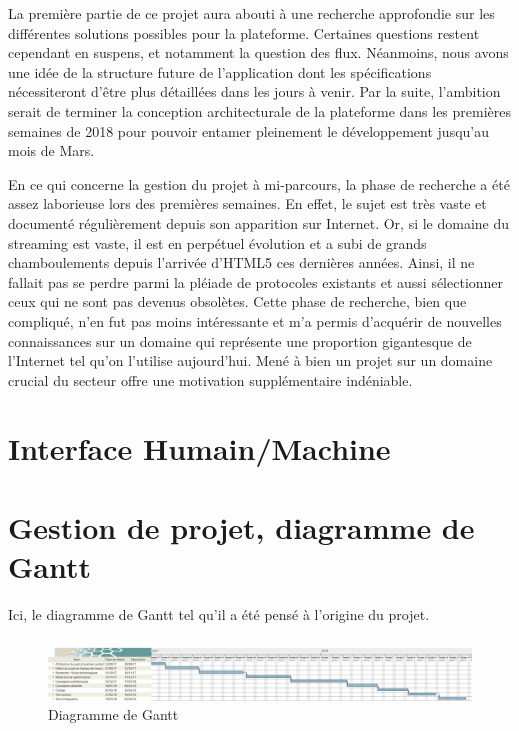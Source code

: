 \documentclass{polytech/polytech}
\begin{document}
La première partie de ce projet aura abouti à une recherche approfondie sur les différentes solutions possibles pour la plateforme. Certaines questions restent cependant en suspens, et notamment la question des flux. Néanmoins, nous avons une idée de la structure future de l’application dont les spécifications nécessiteront d’être plus détaillées dans les jours à venir. Par la suite, l’ambition serait de terminer la conception architecturale de la plateforme dans les premières semaines de 2018 pour pouvoir entamer pleinement le développement jusqu’au mois de Mars.

En ce qui concerne la gestion du projet à mi-parcours, la phase de recherche a été assez laborieuse lors des premières semaines. En effet, le sujet est très vaste et documenté régulièrement depuis son apparition sur Internet. Or, si le domaine du streaming est vaste, il est en perpétuel évolution et a subi de grands chamboulements depuis l’arrivée d’HTML5 ces dernières années. Ainsi, il ne fallait pas se perdre parmi la pléiade de protocoles existants et aussi sélectionner ceux qui ne sont pas devenus obsolètes. Cette phase de recherche, bien que compliqué, n’en fut pas moins intéressante et m’a permis d’acquérir de nouvelles connaissances sur un domaine qui représente une proportion gigantesque de l’Internet tel qu’on l’utilise aujourd’hui. Mené à bien un projet sur un domaine crucial du secteur offre une motivation supplémentaire indéniable.


\appendix

\chapter{Interface Humain/Machine}

\chapter{Gestion de projet, diagramme de Gantt}


Ici, le diagramme de Gantt tel qu'il a été pensé à l'origine du projet. 

\begin{figure}
	\includegraphics[scale=0.2]{images/Diagramme_PR&D}
	\caption{Diagramme de Gantt}
	\label{fig:gantt1}
\end{figure}
\end{document}
